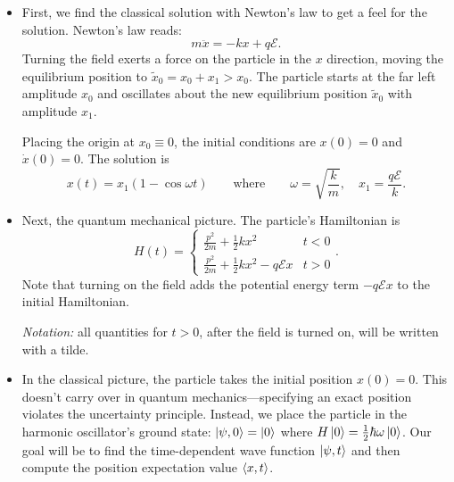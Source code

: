 \documentclass[11pt, a4paper]{article}
\newcommand{\eqtext}[1]{\qquad \text{#1} \qquad}
\begin{document}
\begin{itemize}
	\item First, we find the classical solution with Newton's law to get a feel for the solution. Newton's law reads:
	\begin{equation*}
		m\ddot{x} = -k x + q \mathcal{E}.
	\end{equation*}
	Turning the field exerts a force on the particle in the $ x $ direction, moving the equilibrium position to $ \tilde{x}_{0} = x_{0} + x_{1} > x_{0} $. The particle starts at the far left amplitude $ x_{0} $ and oscillates about the new equilibrium position $ \tilde{x}_{0} $ with amplitude $ x_{1} $. 
	
	Placing the origin at $ x_{0} \equiv 0 $, the initial conditions are $ x(0) = 0 $ and $ \dot{x}(0) = 0 $. The solution is
	\begin{equation*}
		x(t) = x_{1}(1 - \cos \omega t) \eqtext{where} \omega = \sqrt{\frac{k}{m}}, \quad x_{1} = \frac{q\mathcal{E}}{k}.
	\end{equation*}
	
	\item Next, the quantum mechanical picture. The particle's Hamiltonian is
	\begin{equation*}
	H(t) = 
		\begin{cases}
			\frac{p^{2}}{2m} + \frac{1}{2}kx^{2} & t < 0\\
			\frac{p^{2}}{2m} + \frac{1}{2}kx^{2} - q\mathcal{E}x & t > 0
		\end{cases}.
	\end{equation*}
	Note that turning on the field adds the potential energy term $ - q\mathcal{E}x  $ to the initial Hamiltonian. 
	
	\textit{Notation:} all quantities for $ t > 0 $, after the field is turned on, will be written with a tilde. 
	
	\item In the classical picture, the particle takes the initial position $ x(0) = 0 $. This doesn't carry over in quantum mechanics---specifying an exact position violates the uncertainty principle. Instead, we place the particle in the harmonic oscillator's ground state: $ \ket{\psi, 0} = \ket{0} $ where $ H\ket{0} = \frac{1}{2}\hbar \omega \ket{0} $. Our goal will be to find the time-dependent wave function $ \ket{\psi, t} $ and then compute the position expectation value $ \ev{x, t} $. 
	

\end{itemize}
\end{document}
